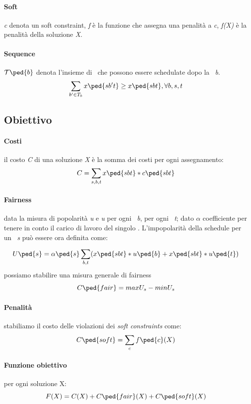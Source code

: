         \paragraph{Soft} \textit{c} denota un soft constraint, \textit{f} è la funzione che assegna una penalità a \textit{c}, \textit{f(X)} è la penalità della soluzione \textit{X}.
        \paragraph{Sequence} $\mathcal{T}\ped{b}$ denota l'insieme di \ttb\ che possono essere schedulate dopo la \ttb\ \textit{b}. \[\sum_{b'\in T_b} x\ped{sb't} \ge x\ped{sbt}, \forall b,s,t\]
    \subsection{Obiettivo}
        \paragraph{Costi} il costo \textit{C} di una soluzione \textit{X} è la somma dei costi per ogni assegnamento: \[C=\sum_{s,b,t} x\ped{sbt}*c\ped{sbt}\]
        \paragraph{Fairness} data la misura di popolarità \textit{u} e \textit{u} per ogni \ttb\ \textit{b}, per ogni \task\ \textit{t}; dato \textit{$\alpha$} coefficiente per tenere in conto il carico di lavoro del singolo \items. L'impopolarità della schedule per un \items\ \textit{s} può essere ora definita come:
        
        \[U\ped{s}=\alpha \ped{s} \sum_{b,t}( x\ped{sbt}*u\ped{b} + x\ped{sbt}*u\ped{t})\]
        possiamo stabilire una misura generale di fairness
        \[C\ped{fair}= max U_s - minU_s\]
        \paragraph{Penalità} stabiliamo il costo delle violazioni dei \textit{soft constraints} come:
        \[C\ped{soft}=\sum_{c} f\ped{c}(X)\]
        \paragraph{Funzione obiettivo} per ogni soluzione X:
        \[F(X)= C(X) + C\ped{fair}(X) + C\ped{soft}(X)\]
